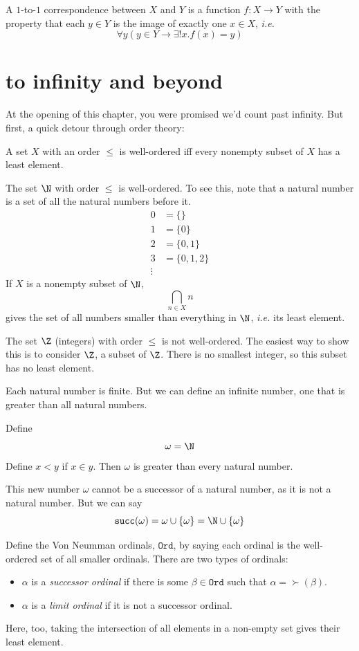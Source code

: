 \documentclass{scrbook}
\renewcommand{\implies}{\to}
\newcommand{\ie}{\emph{i.e.}\xspace}
\newcommand{\ord}{\mathtt{Ord}}
\begin{document}
\begin{defn}[$1$-to-$1$ correspondence]
  A $1$-to-$1$ correspondence between $X$ and $Y$ is a function $f:X\to Y$ with the property that each $y\in Y$ is the image of exactly one $x\in X$, \ie 
  \[
  \forall y (y\in Y\implies \exists! x . f(x)=y)
  \]
\end{defn}

\section[To infinity and beyond]{to infinity and beyond}
At the opening of this chapter, you were promised we'd count past infinity. But first, a quick detour through order theory: 
\begin{defn}
  \label{def:well-ordered}
  A set $X$ with an order $\leq$ is well-ordered iff every nonempty subset of $X$ has a least element. 
\end{defn}
\begin{example}
  The set $\N$ with order $\leq$ is well-ordered. To see this, note that a natural number is a set of all the natural numbers before it.
  \begin{align*}
    0 &= \{\} \\
    1 &= \{0\}\\
    2 &= \{0,1\}\\
    3 &= \{0,1,2\}\\
    \vdots 
  \end{align*}
  If $X$ is a nonempty subset of $\N$,
  \[
  \bigcap_{n\in X} n 
  \]
  gives the set of all numbers smaller than everything in $\N$, \ie its least element. 
\end{example}
\begin{example}
  The set $\Z$ (integers) with order $\leq$ is not well-ordered. The easiest way to show this is to consider $\Z$, a subset of $\Z$. There is no smallest integer, so this subset has no least element. 
\end{example}
Each natural number is finite. But we can define an infinite number, one that is greater than all natural numbers.
\begin{defn}[\omega]
  Define
  \[
  \omega=\N
  \]
  Define $x<y$ if $x\in y$. Then $\omega$ is greater than every natural number. 
\end{defn}
This new number $\omega$ cannot be a successor of a natural number, as it is not a natural number. But we can say
\[
\succ(\omega) = \omega \cup \{\omega\} = \N \cup \{\omega\}
\]
\begin{defn}[ordinals]
  Define the Von Neumman ordinals, $\ord$, by saying each ordinal is the well-ordered set of all smaller ordinals. There are two types of ordinals:
  \begin{itemize}
  \item $\alpha$ is a \emph{successor ordinal} if there is some $\beta \in \ord$ such that $\alpha=\succ(\beta)$. 
  \item $\alpha$ is a \emph{limit ordinal} if it is not a successor ordinal. 
  \end{itemize}
  Here, too, taking the intersection of all elements in a non-empty set gives their least element. 
\end{defn}
\end{document}
